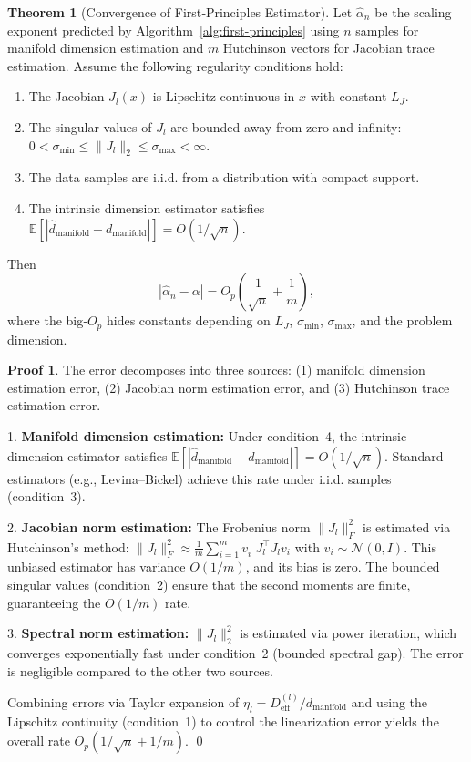\documentclass[11pt, a4paper]{article}
\theoremstyle{definition}
\newtheorem{theorem}{Theorem}[section]
\newtheorem*{pf}{Proof}
\begin{document}
\begin{theorem}[Convergence of First‑Principles Estimator]
\label{thm:first-principles-convergence}
Let $\hat{\alpha}_n$ be the scaling exponent predicted by Algorithm~\ref{alg:first-principles} using $n$ samples for manifold dimension estimation and $m$ Hutchinson vectors for Jacobian trace estimation. Assume the following regularity conditions hold:
\begin{enumerate}
    \item The Jacobian $J_l(x)$ is Lipschitz continuous in $x$ with constant $L_J$.
    \item The singular values of $J_l$ are bounded away from zero and infinity: $0 < \sigma_{\min} \leq \|J_l\|_2 \leq \sigma_{\max} < \infty$.
    \item The data samples are i.i.d. from a distribution with compact support.
    \item The intrinsic dimension estimator satisfies $\mathbb{E}[|\hat{d}_{\text{manifold}} - d_{\text{manifold}}|] = O(1/\sqrt{n})$.
\end{enumerate}
Then
\begin{equation}
|\hat{\alpha}_n - \alpha| = O_p\left(\frac{1}{\sqrt{n}} + \frac{1}{m}\right),
\end{equation}
where the big‑$O_p$ hides constants depending on $L_J$, $\sigma_{\min}$, $\sigma_{\max}$, and the problem dimension.
\end{theorem}

\begin{pf}
The error decomposes into three sources: (1) manifold dimension estimation error, (2) Jacobian norm estimation error, and (3) Hutchinson trace estimation error.

1. \textbf{Manifold dimension estimation:} Under condition~4, the intrinsic dimension estimator satisfies $\mathbb{E}[|\hat{d}_{\text{manifold}} - d_{\text{manifold}}|] = O(1/\sqrt{n})$. Standard estimators (e.g., Levina--Bickel) achieve this rate under i.i.d. samples (condition~3).

2. \textbf{Jacobian norm estimation:} The Frobenius norm $\|J_l\|_F^2$ is estimated via Hutchinson's method: $\|J_l\|_F^2 \approx \frac{1}{m}\sum_{i=1}^m v_i^\top J_l^\top J_l v_i$ with $v_i \sim \mathcal{N}(0,I)$. This unbiased estimator has variance $O(1/m)$, and its bias is zero. The bounded singular values (condition~2) ensure that the second moments are finite, guaranteeing the $O(1/m)$ rate.

3. \textbf{Spectral norm estimation:} $\|J_l\|_2^2$ is estimated via power iteration, which converges exponentially fast under condition~2 (bounded spectral gap). The error is negligible compared to the other two sources.

Combining errors via Taylor expansion of $\eta_l = D_{\text{eff}}^{(l)}/d_{\text{manifold}}$ and using the Lipschitz continuity (condition~1) to control the linearization error yields the overall rate $O_p(1/\sqrt{n} + 1/m)$.
\qed
\end{pf}
\end{document}
